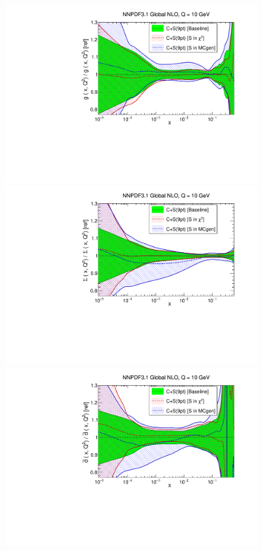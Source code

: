 \FloatBarrier

\begin{figure}[h]
  \begin{center}
    \includegraphics[scale=0.39]{mhous/plots/xg-Global-NLO-CovMatTH-tests.pdf}
    \includegraphics[scale=0.39]{mhous/plots/xsinglet-Global-NLO-CovMatTH-tests.pdf}
    \includegraphics[scale=0.39]{mhous/plots/xdbar-Global-NLO-CovMatTH-tests.pdf}

\end{center}
\end{figure}
